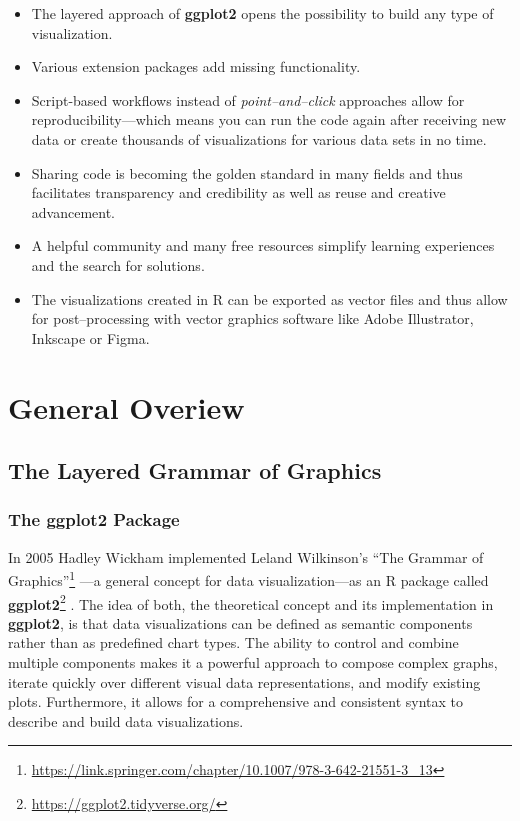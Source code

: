 \documentclass[
]{krantz}
\providecommand{\tightlist}{%
  \setlength{\itemsep}{0pt}\setlength{\parskip}{0pt}}
\renewcommand{\href}[2]{#2\footnote{\url{#1}}}
\begin{document}
\begin{itemize}
\tightlist
\item
  The layered approach of \textbf{ggplot2} opens the possibility to build any type of visualization.
\item
  Various extension packages add missing functionality.
\item
  Script-based workflows instead of \emph{point--and--click} approaches allow for reproducibility---which means you can run the code again after receiving new data or create thousands of visualizations for various data sets in no time.
\item
  Sharing code is becoming the golden standard in many fields and thus facilitates transparency and credibility as well as reuse and creative advancement.
\item
  A helpful community and many free resources simplify learning experiences and the search for solutions.
\item
  The visualizations created in R can be exported as vector files and thus allow for post--processing with vector graphics software like Adobe Illustrator, Inkscape or Figma.
\end{itemize}

\hypertarget{part-general-overiew}{%
\part{General Overiew}\label{part-general-overiew}}

\hypertarget{grammar}{%
\chapter{The Layered Grammar of Graphics}\label{grammar}}

\hypertarget{ggplot}{%
\section{The ggplot2 Package}\label{ggplot}}

In 2005 Hadley Wickham implemented Leland Wilkinson's \href{https://link.springer.com/chapter/10.1007/978-3-642-21551-3_13}{``The Grammar of Graphics''} \citep{wilkinson2005}---a general concept for data visualization---as an R package called \href{https://ggplot2.tidyverse.org/}{\textbf{ggplot2}} \citep{ggplot2}. The idea of both, the theoretical concept and its implementation in \textbf{ggplot2}, is that data visualizations can be defined as semantic components rather than as predefined chart types. The ability to control and combine multiple components makes it a powerful approach to compose complex graphs, iterate quickly over different visual data representations, and modify existing plots. Furthermore, it allows for a comprehensive and consistent syntax to describe and build data visualizations.
\end{document}
